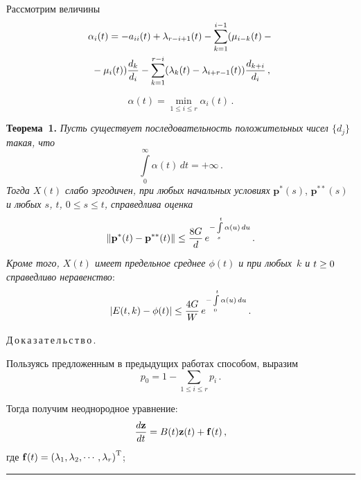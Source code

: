\begin{multicols}{2}
Рассмотрим величины
\begin{multline*}
\alpha_i(t)= -a_{ii}(t)+\lambda_{r-i+1}(t)-\sum\limits_{k=1}^{i-1}(\mu_{i-k}(t)-{}\\
{}-
\mu_i(t))\displaystyle\frac{\displaystyle d_k\mathstrut}{\displaystyle d_i\mathstrut}-\sum\limits_{k=1}^{r-i}(\lambda_k(t)-\lambda_{i+r-1}(t))\displaystyle\frac{\displaystyle d_{k+i}\mathstrut}{\displaystyle d_i\mathstrut}\,,
\end{multline*}

\noindent
\begin{equation*}
\alpha(t)=\min\limits_{1 \le i \le r}\alpha_i(t)\,.
\end{equation*}

\smallskip

\noindent
\textbf{Теорема~1.} \textit{Пусть существует последовательность положительных 
чисел  $\{d_j\}$ такая, что}
\begin{equation}
\int\limits_0^{\infty} \alpha(t)\, dt = + \infty\,.
\label{2.031}
\end{equation}
\textit{Тогда $X(t)$ слабо эргодичен, при
любых начальных условиях} $\mathbf{p}^*(s)$, $\mathbf{p}^{**}(s)$ 
\textit{и любых $s$, $t$, $0\le s\le t$, справедлива оценка
\begin{equation} 
\label{2.04}
\|{\mathbf p}^*(t)-{\mathbf p}^{**}(t)\| \le \displaystyle\frac{\displaystyle 8G\mathstrut}{\displaystyle d\mathstrut}\,e^{-\int\limits_s^t {\alpha(u)\,du}}\,.
\end{equation}
Кроме того,  $X(t)$ имеет предельное среднее $\phi(t)$ и при любых~$k$ и $t \hm\ge 0$ справедливо неравенство}:
\begin{equation}
\label{2.05}
|E(t,k)-\phi(t)|\le \displaystyle\frac{\displaystyle 4G\mathstrut}{\displaystyle W\mathstrut}\,e^{-\int\limits_0^t {\alpha(u)\,du}}\,.
\end{equation}


\smallskip


\noindent
Д\,о\,к\,а\,з\,а\,т\,е\,л\,ь\,с\,т\,в\,о\,.\

Пользуясь предложенным в предыдущих работах способом, 
выразим 
$$
p_0=1-\sum\limits_{1\le i \le r}{p_i}\,.
$$

Тогда получим неоднородное уравнение:
\begin{equation} 
\label{ur_per}
\displaystyle\frac{\displaystyle d{\mathbf z}\mathstrut}{\displaystyle dt\mathstrut}= B(t){\mathbf z}(t)+{\mathbf f}(t)\,, 
\end{equation}
\noindent
где ${\mathbf f}(t)=\left(\lambda_1, \lambda_2,\cdots,\lambda_r \right)^{\mathrm{T}}$;

\end{multicols}


\hrule

\vspace*{6pt}

